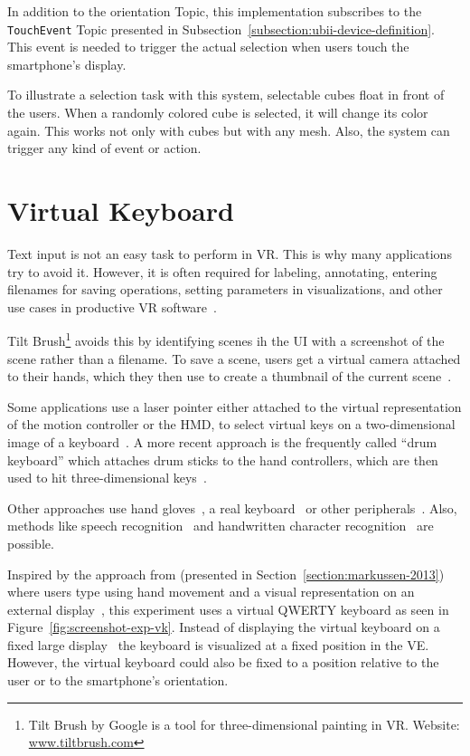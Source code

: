 In addition to the orientation Topic, this implementation subscribes to the \lstinline{TouchEvent} Topic presented in Subsection~\ref{subsection:ubii-device-definition}. This event is needed to trigger the actual selection when users touch the smartphone's display.

To illustrate a selection task with this system, selectable cubes float in front of the users. 
When a randomly colored cube is selected, it will change its color again. This works not only with cubes but with any mesh. Also, the system can trigger any kind of event or action.


\section{Virtual Keyboard}\label{section:virtual-keyboard}

Text input is not an easy task to perform in \gls{VR}. This is why many applications try to avoid it. However, it is often required for labeling, annotating, entering filenames for saving operations, setting parameters in visualizations, and other use cases in productive \gls{VR} software~\cite[2154]{Rhoton.2002}. 

Tilt Brush\footnote{Tilt Brush by Google is a tool for three-dimensional painting in VR. Website: \href{https://www.tiltbrush.com/}{www.tiltbrush.com}} avoids this by identifying scenes ih the \gls{UI} with a screenshot of the scene rather than a filename. To save a scene, users get a virtual camera attached to their hands, which they then use to create a thumbnail of the current scene~\cite{GoogleLLC.2019}. %

Some applications use a laser pointer either attached to the virtual representation of the motion controller or the \gls{HMD}, to select virtual keys on a two-dimensional image of a keyboard~\cite{Speicher.2018}. A more recent approach is the frequently called \enquote{drum keyboard} which attaches drum sticks to the hand controllers, which are then used to hit three-dimensional keys~\cite{Weisel.2017}.

Other approaches use hand gloves~\cite{Evans.1999,Rhoton.2002}, a real keyboard~\cite{McGill.2015,Walker.2017} or other peripherals~\cite[111\psq]{Gonzalez.2009}. Also, methods like speech recognition~\cite[2154\psqq]{Rhoton.2002} and handwritten character recognition~\cite[113]{Gonzalez.2009} are possible.

Inspired by the approach from \citeauthor{Markussen.2013} (presented in Section~\ref{section:markussen-2013}) where users type using hand movement and a visual representation on an external display~\cite[408]{Markussen.2013}, this experiment uses a virtual QWERTY keyboard as seen in Figure~\ref{fig:screenshot-exp-vk}.
Instead of displaying the virtual keyboard on a fixed large display~\cite[408]{Markussen.2013} the keyboard is visualized at a fixed position in the \gls{VE}. However, the virtual keyboard could also be fixed to a position relative to the user or to the smartphone's orientation.

